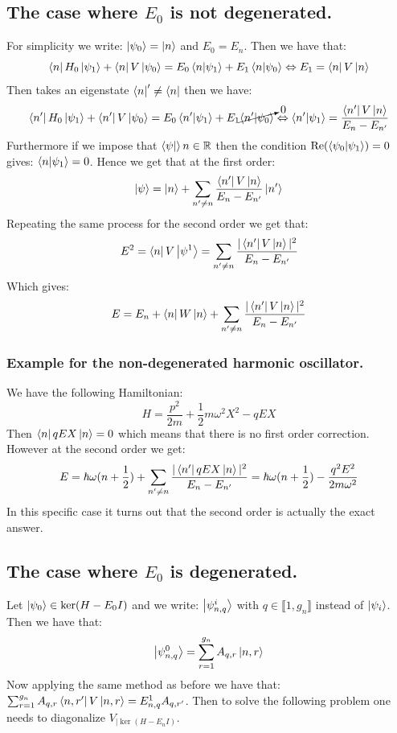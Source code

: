 \documentclass[10pt,a4paper]{book}
\begin{document}
\subsection{The case where $E_0$ is not degenerated.}
For simplicity we write: $\ket{\psi_0} = \ket{n}$ and $E_0 = E_n$. Then we have that:
\[
\bra n H_0 \ket{\psi_1} + \bra n V \ket{\psi_0} = E_0 \bra n \ket{\psi_1} + E_1 \bra n \ket{\psi_0} \Leftrightarrow E_1 = \bra n V \ket n
\]
Then takes an eigenstate $\bra n' \neq \bra n$ then we have:
\[
\bra{n'} H_0 \ket{\psi_1} + \bra{ n'} V \ket{\psi_0} = E_0 \bra{ n'} \ket{\psi_1} + E_1 \cancelto{0}{\bra{ n'} \ket{\psi_0}} \Leftrightarrow \bra{n'} \ket {\psi_1} = \frac{\bra{n'} V \ket n}{E_n - E_{n'}}
\]
Furthermore if we impose that $\bra \psi \ket n \in \mathbb{R}$ then the condition $\Re(\bra{\psi_0}\ket{\psi_1}) = 0$ gives: $\bra n \ket{\psi_1} = 0$. Hence we get that at the first order:
\[
\ket \psi = \ket n + \sum_{n' \neq n} \frac{\bra{n'} V \ket n}{E_n - E_{n'}} \ket{n'}
\]
Repeating the same process for the second order we get that:
\[
E^2 = \bra n V \ket{\psi^1} = \sum_{n' \neq n} \frac{|\bra{n'} V \ket n|^2}{E_n - E_{n'}}
\]
Which gives:
\[
E = E_n + \bra n W \ket n +  \sum_{n' \neq n} \frac{|\bra{n'} V \ket n|^2}{E_n - E_{n'}}
\]

\subsubsection{Example for the non-degenerated harmonic oscillator.}
We have the following Hamiltonian:
\[
H = \frac{p^2}{2m} + \frac{1}{2} m \omega^2 X^2 - q E X
\]
Then $\bra n q E X \ket n = 0$ which means that there is no first order correction. However at the second order we get:
\[
E = \hbar \omega (n + \frac{1}{2}) + \sum_{n' \neq n} \frac{|\bra{n'} q E X \ket{n}|^2}{E_n - E_{n'}} = \hbar \omega(n + \frac{1}{2}) - \frac{q^2 E^2}{2 m \omega^2}
\]
In this specific case it turns out that the second order is actually the exact answer.

\subsection{The case where $E_0$ is degenerated.}
Let $\ket {\psi_0} \in \ker (H - E_0 I)$ and we write: $\ket {\psi^i_{n,q}}$ with $q \in \llbracket 1, g_n\rrbracket$ instead of $\ket{\psi_i}$. Then we have that:
\[
\ket{\psi^0_{n, q}} = \sum_{r = 1}^{g_n} A_{q, r} \ket{n, r}
\]
Now applying the same method as before we have that: $ \sum_{r = 1}^{g_n} A_{q, r} \bra{n, r'} V \ket{n, r} = E^1_{n, q} A_{q, r'}$. Then to solve the following problem one needs to diagonalize $V_{|\ker(H - E_n I)}$.
\end{document}
